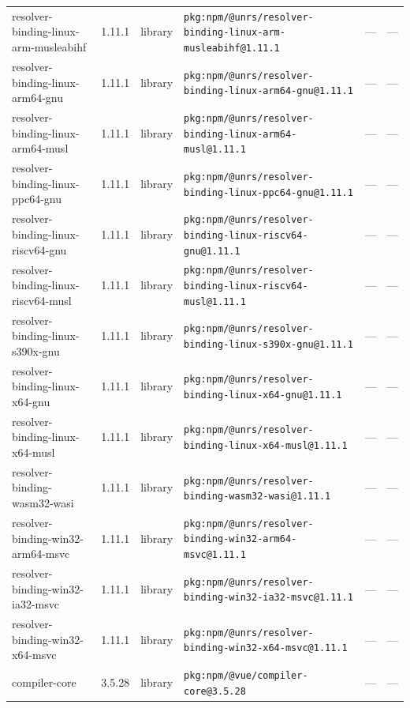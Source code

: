 \documentclass[11pt,a4paper]{article}
\begin{document}
\begin{longtable}{|p{4cm}|p{2cm}|p{1.6cm}|p{5cm}|p{1.5cm}|p{3.5cm}|}
\raggedright resolver-binding-linux-arm-musleabihf & 1.11.1 & library & \small\texttt{pkg:npm/@unrs/resolver-binding-linux-arm-musleabihf@1.11.1} & — & \small — \\
\raggedright resolver-binding-linux-arm64-gnu & 1.11.1 & library & \small\texttt{pkg:npm/@unrs/resolver-binding-linux-arm64-gnu@1.11.1} & — & \small — \\
\raggedright resolver-binding-linux-arm64-musl & 1.11.1 & library & \small\texttt{pkg:npm/@unrs/resolver-binding-linux-arm64-musl@1.11.1} & — & \small — \\
\raggedright resolver-binding-linux-ppc64-gnu & 1.11.1 & library & \small\texttt{pkg:npm/@unrs/resolver-binding-linux-ppc64-gnu@1.11.1} & — & \small — \\
\raggedright resolver-binding-linux-riscv64-gnu & 1.11.1 & library & \small\texttt{pkg:npm/@unrs/resolver-binding-linux-riscv64-gnu@1.11.1} & — & \small — \\
\raggedright resolver-binding-linux-riscv64-musl & 1.11.1 & library & \small\texttt{pkg:npm/@unrs/resolver-binding-linux-riscv64-musl@1.11.1} & — & \small — \\
\raggedright resolver-binding-linux-s390x-gnu & 1.11.1 & library & \small\texttt{pkg:npm/@unrs/resolver-binding-linux-s390x-gnu@1.11.1} & — & \small — \\
\raggedright resolver-binding-linux-x64-gnu & 1.11.1 & library & \small\texttt{pkg:npm/@unrs/resolver-binding-linux-x64-gnu@1.11.1} & — & \small — \\
\raggedright resolver-binding-linux-x64-musl & 1.11.1 & library & \small\texttt{pkg:npm/@unrs/resolver-binding-linux-x64-musl@1.11.1} & — & \small — \\
\raggedright resolver-binding-wasm32-wasi & 1.11.1 & library & \small\texttt{pkg:npm/@unrs/resolver-binding-wasm32-wasi@1.11.1} & — & \small — \\
\raggedright resolver-binding-win32-arm64-msvc & 1.11.1 & library & \small\texttt{pkg:npm/@unrs/resolver-binding-win32-arm64-msvc@1.11.1} & — & \small — \\
\raggedright resolver-binding-win32-ia32-msvc & 1.11.1 & library & \small\texttt{pkg:npm/@unrs/resolver-binding-win32-ia32-msvc@1.11.1} & — & \small — \\
\raggedright resolver-binding-win32-x64-msvc & 1.11.1 & library & \small\texttt{pkg:npm/@unrs/resolver-binding-win32-x64-msvc@1.11.1} & — & \small — \\
\raggedright compiler-core & 3.5.28 & library & \small\texttt{pkg:npm/@vue/compiler-core@3.5.28} & — & \small — \\

\end{longtable}
\end{document}
